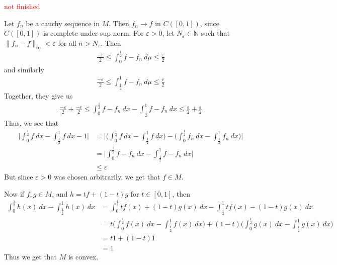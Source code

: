 \documentclass[12pt]{exam}
\theoremstyle{plain} %
\theoremstyle{definition} %
\theoremstyle{remark} %
\begin{document}
\begin{questions}
  \question
  \textcolor{red}{not finished}
  \begin{solution}
    Let $f_n$ be a cauchy sequence in $M$. Then $f_n \to f$ in $C([0,
    1])$, since $C([0, 1])$ is complete under sup norm. For
    $\varepsilon > 0$, let  $N_\varepsilon \in \mathbb{N}$ such that
    $\|f_n - f\|_\infty < \varepsilon$ for all $n > N_\varepsilon$.
    Then
    \begin{align*}
      \frac{-\varepsilon}{2} \le \int_{0}^{\frac{1}{2}} f - f_n \ d
      \mu \le \frac{\varepsilon}{2}
    \end{align*}
    and similarly
    \begin{align*}
      \frac{-\varepsilon}{2} \le \int_{\frac{1}{2}}^{1} f - f_n \ d
      \mu \le \frac{\varepsilon}{2}
    \end{align*}
    Together, they give us
    \begin{align*}
      \frac{-\varepsilon}{2} + \frac{-\varepsilon}{2} \le
      \int_{0}^{\frac{1}{2}} f - f_n \ dx - \int_{\frac{1}{2}}^{1} f - f_n
      \ dx \le \frac{\varepsilon}{2} + \frac{\varepsilon}{2}
    \end{align*}
    Thus, we see that
    \begin{align*}
      \Bigg|\int_{0}^{\frac{1}{2}} f \ dx - \int_{\frac{1}{2}}^{1} f
      \ dx - 1 \Bigg| &= \Bigg|\Big(\int_{0}^{\frac{1}{2}} f \ dx -
      \int_{\frac{1}{2}}^{1} f \ dx \Big) -  \Big(\int_{0}^{\frac{1}{2}} f_n
      \ dx - \int_{\frac{1}{2}}^{1} f_n \ dx \Big) \Bigg|\\
      &= \Bigg| \int_{0}^{\frac{1}{2}} f - f_n \ dx -
      \int_{\frac{1}{2}}^{1} f - f_n \ dx \Bigg| \\
      &\le \varepsilon
    \end{align*}
    But since $\varepsilon > 0$ was chosen arbitrarily, we get that $f \in M$.

    Now if $f, g \in M$, and $h = t f + (1-t) g$ for $ t \in [0, 1]$, then
    \begin{align*}
      \int_{0}^{\frac{1}{2}} h(x) \ dx - \int_{\frac{1}{2}}^{1} h(x)
      \ dx &= \int_{0}^{\frac{1}{2}} t f(x) + (1-t) g(x) \ dx -
      \int_{\frac{1}{2}}^{1} t f(x) - (1-t) g(x)\ dx \\
      &= t \Big(\int_{0}^{\frac{1}{2}} f(x) \ dx -
      \int_{\frac{1}{2}}^{1} f(x) \ dx  \Big) + (1-t)
      \Big(\int_{0}^{\frac{1}{2}} g(x) \ dx - \int_{\frac{1}{2}}^{1}
      g(x) \ dx\Big) \\
      &= t 1 + (1-t)1 \\
      &= 1
    \end{align*}
    Thus we get that $M$ is convex.


\end{solution}
\end{questions}
\end{document}
